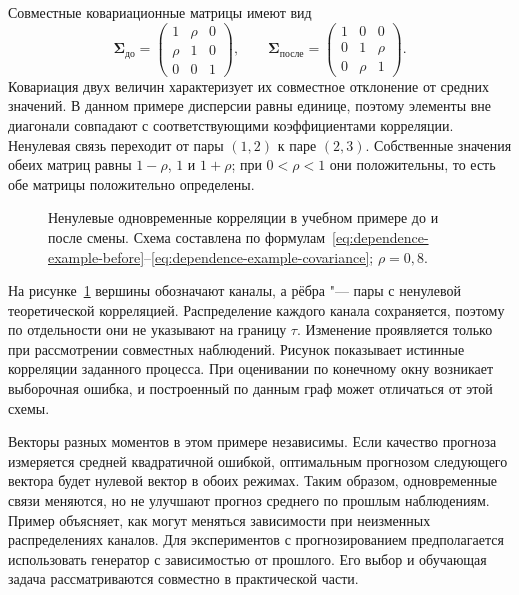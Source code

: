 \documentclass[bachelor, och, diploma]{SCWorks}
\begin{document}
Совместные ковариационные матрицы имеют вид
\begin{equation}
    \boldsymbol{\Sigma}_{\text{до}}=
    \begin{pmatrix}
        1 & \rho & 0\\
        \rho & 1 & 0\\
        0 & 0 & 1
    \end{pmatrix},
    \qquad
    \boldsymbol{\Sigma}_{\text{после}}=
    \begin{pmatrix}
        1 & 0 & 0\\
        0 & 1 & \rho\\
        0 & \rho & 1
    \end{pmatrix}.
    \label{eq:dependence-example-covariance}
\end{equation}
Ковариация двух величин характеризует их совместное отклонение от средних значений. В данном примере дисперсии равны единице, поэтому элементы вне диагонали совпадают с соответствующими коэффициентами корреляции. Ненулевая связь переходит от пары $(1,2)$ к паре $(2,3)$. Собственные значения обеих матриц равны $1-\rho$, $1$ и $1+\rho$; при $0<\rho<1$ они положительны, то есть обе матрицы положительно определены.

\begin{figure}[htbp]
    \centering
    
    \caption{Ненулевые одновременные корреляции в учебном примере до и после смены. Схема составлена по формулам~\eqref{eq:dependence-example-before}--\eqref{eq:dependence-example-covariance}; $\rho=0{,}8$.}
    \label{fig:dependence-change-example}
\end{figure}

\begin{samepage}
На рисунке~\ref{fig:dependence-change-example} вершины обозначают каналы, а рёбра "--- пары с ненулевой теоретической корреляцией. Распределение каждого канала сохраняется, поэтому по отдельности они не указывают на границу $\tau$. Изменение проявляется только при рассмотрении совместных наблюдений. Рисунок показывает истинные корреляции заданного процесса. При оценивании по конечному окну возникает выборочная ошибка, и построенный по данным граф может отличаться от этой схемы.

\end{samepage}

Векторы разных моментов в этом примере независимы. Если качество прогноза измеряется средней квадратичной ошибкой, оптимальным прогнозом следующего вектора будет нулевой вектор в обоих режимах. Таким образом, одновременные связи меняются, но не улучшают прогноз среднего по прошлым наблюдениям. Пример объясняет, как могут меняться зависимости при неизменных распределениях каналов. Для экспериментов с прогнозированием предполагается использовать генератор с зависимостью от прошлого. Его выбор и обучающая задача рассматриваются совместно в практической части.
\end{document}
